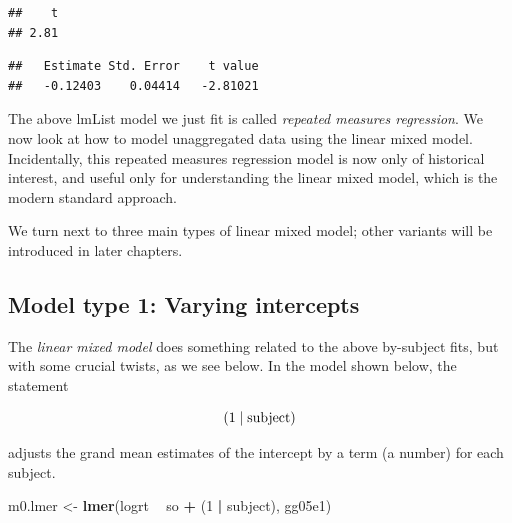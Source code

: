 \documentclass[12pt,]{krantz}
\newenvironment{Shaded}{\begin{snugshade}}{\end{snugshade}}
\newcommand{\CommentTok}[1]{\textcolor[rgb]{0.56,0.35,0.01}{\textit{#1}}}
\newcommand{\DecValTok}[1]{\textcolor[rgb]{0.00,0.00,0.81}{#1}}
\newcommand{\KeywordTok}[1]{\textcolor[rgb]{0.13,0.29,0.53}{\textbf{#1}}}
\newcommand{\NormalTok}[1]{#1}
\newcommand{\OperatorTok}[1]{\textcolor[rgb]{0.81,0.36,0.00}{\textbf{#1}}}
\newcommand{\StringTok}[1]{\textcolor[rgb]{0.31,0.60,0.02}{#1}}
\begin{document}
\begin{verbatim}
##    t 
## 2.81
\end{verbatim}

\begin{Shaded}
\end{Shaded}

\begin{verbatim}
##   Estimate Std. Error    t value 
##   -0.12403    0.04414   -2.81021
\end{verbatim}

The above lmList model we just fit is called \emph{repeated measures regression}. We now look at how to model unaggregated data using the linear mixed model. Incidentally, this repeated measures regression model is now only of historical interest, and useful only for understanding the linear mixed model, which is the modern standard approach.

We turn next to three main types of linear mixed model; other variants will be introduced in later chapters.

\hypertarget{model-type-1-varying-intercepts}{%
\subsection{Model type 1: Varying intercepts}\label{model-type-1-varying-intercepts}}

The \emph{linear mixed model} does something related to the above by-subject fits, but with some crucial twists, as we see below.
In the model shown below, the statement

\begin{equation}
(1 \mid \hbox{subject}) 
\end{equation}

adjusts the grand mean estimates of the intercept by a term (a number) for each subject.

\begin{Shaded}
\begin{Highlighting}[]
\NormalTok{m0.lmer <-}\StringTok{ }\KeywordTok{lmer}\NormalTok{(logrt }\OperatorTok{~}\StringTok{ }\NormalTok{so }\OperatorTok{+}\StringTok{ }\NormalTok{(}\DecValTok{1} \OperatorTok{|}\StringTok{ }\NormalTok{subject), gg05e1)}
\end{Highlighting}
\end{Shaded}
\end{document}
